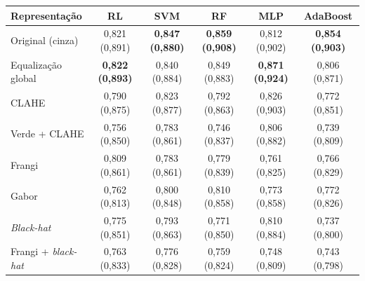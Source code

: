 \begin{tabular}{lccccc}
\toprule
Representação & RL & SVM & RF & MLP & AdaBoost \\
\midrule
Original (cinza) & 0,821 (0,891) & \textbf{0,847 (0,880)} & \textbf{0,859 (0,908)} & 0,812 (0,902) & \textbf{0,854 (0,903)} \\
Equalização global & \textbf{0,822 (0,893)} & 0,840 (0,884) & 0,849 (0,883) & \textbf{0,871 (0,924)} & 0,806 (0,871) \\
CLAHE & 0,790 (0,875) & 0,823 (0,877) & 0,792 (0,863) & 0,826 (0,903) & 0,772 (0,851) \\
Verde + CLAHE & 0,756 (0,850) & 0,783 (0,861) & 0,746 (0,837) & 0,806 (0,882) & 0,739 (0,809) \\
\midrule
Frangi & 0,809 (0,861) & 0,783 (0,861) & 0,779 (0,839) & 0,761 (0,825) & 0,766 (0,829) \\
Gabor & 0,762 (0,813) & 0,800 (0,848) & 0,810 (0,858) & 0,773 (0,858) & 0,772 (0,826) \\
\textit{Black-hat} & 0,775 (0,851) & 0,793 (0,863) & 0,771 (0,850) & 0,810 (0,884) & 0,737 (0,800) \\
Frangi + \textit{black-hat} & 0,763 (0,833) & 0,776 (0,828) & 0,759 (0,824) & 0,748 (0,809) & 0,743 (0,798) \\
\bottomrule
\end{tabular}
